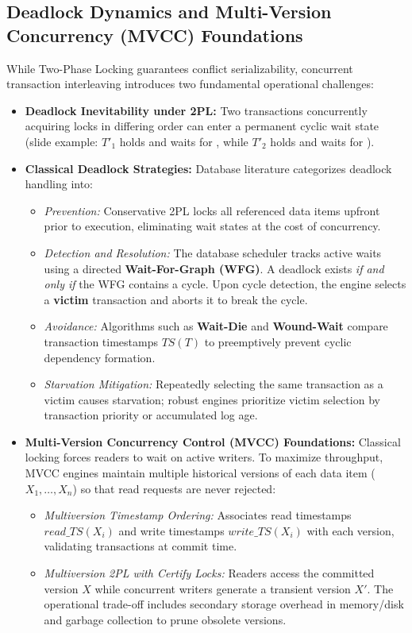 \subsection{Deadlock Dynamics and Multi-Version Concurrency (MVCC) Foundations}
\label{sec:r5-theory-deadlock-mvcc}
While Two-Phase Locking guarantees conflict serializability, concurrent transaction interleaving introduces two fundamental operational challenges:
\begin{itemize}
  \item \textbf{Deadlock Inevitability under 2PL:} Two transactions concurrently acquiring locks in differing order can enter a permanent cyclic wait state (slide example: $T'_1$ holds  and waits for , while $T'_2$ holds  and waits for ).
  \item \textbf{Classical Deadlock Strategies:} Database literature categorizes deadlock handling into:
  \begin{itemize}
    \item \emph{Prevention:} Conservative 2PL locks all referenced data items upfront prior to execution, eliminating wait states at the cost of concurrency.
    \item \emph{Detection and Resolution:} The database scheduler tracks active waits using a directed \textbf{Wait-For-Graph (WFG)}. A deadlock exists \emph{if and only if} the WFG contains a cycle. Upon cycle detection, the engine selects a \textbf{victim} transaction and aborts it to break the cycle.
    \item \emph{Avoidance:} Algorithms such as \textbf{Wait-Die} and \textbf{Wound-Wait} compare transaction timestamps $TS(T)$ to preemptively prevent cyclic dependency formation.
    \item \emph{Starvation Mitigation:} Repeatedly selecting the same transaction as a victim causes starvation; robust engines prioritize victim selection by transaction priority or accumulated log age.
  \end{itemize}
  \item \textbf{Multi-Version Concurrency Control (MVCC) Foundations:} Classical locking forces readers to wait on active writers. To maximize throughput, MVCC engines maintain multiple historical versions of each data item ($X_1, \dots, X_n$) so that read requests are never rejected:
  \begin{itemize}
    \item \emph{Multiversion Timestamp Ordering:} Associates read timestamps $read\_TS(X_i)$ and write timestamps $write\_TS(X_i)$ with each version, validating transactions at commit time.
    \item \emph{Multiversion 2PL with Certify Locks:} Readers access the committed version $X$ while concurrent writers generate a transient version $X'$. The operational trade-off includes secondary storage overhead in memory/disk and garbage collection to prune obsolete versions.
  \end{itemize}
\end{itemize}

